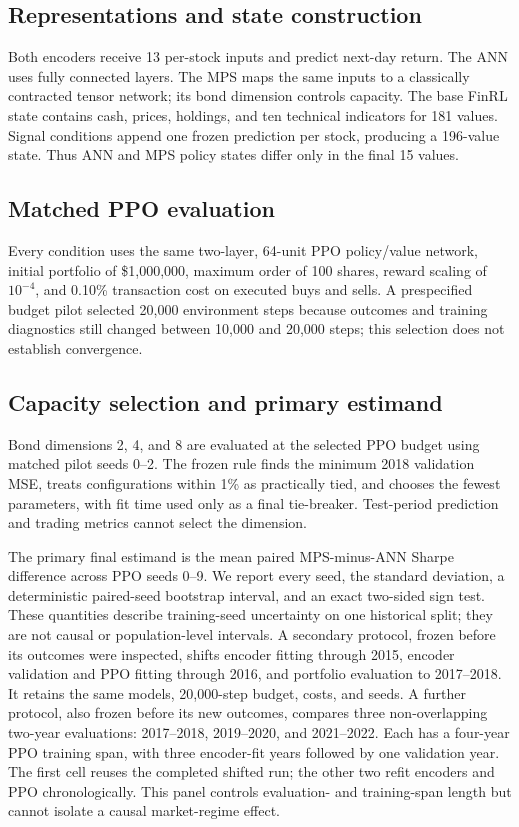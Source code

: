 \documentclass[conference]{IEEEtran}
\begin{document}
\subsection{Representations and state construction}

Both encoders receive 13 per-stock inputs and predict next-day return. The ANN
uses fully connected layers. The MPS maps the same inputs to a classically
contracted tensor network; its bond dimension controls capacity. The base
FinRL state contains cash, prices, holdings, and ten technical indicators for
181 values. Signal conditions append one frozen prediction per stock, producing
a 196-value state. Thus ANN and MPS policy states differ only in the final 15
values.

\subsection{Matched PPO evaluation}

Every condition uses the same two-layer, 64-unit PPO policy/value network,
initial portfolio of \$1,000,000, maximum order of 100 shares, reward scaling
of \(10^{-4}\), and 0.10\% transaction cost on executed buys and sells. A
prespecified budget pilot selected 20,000 environment steps because outcomes
and training diagnostics still changed between 10,000 and 20,000 steps; this
selection does not establish convergence.

\subsection{Capacity selection and primary estimand}

Bond dimensions 2, 4, and 8 are evaluated at the selected PPO budget using
matched pilot seeds 0--2. The frozen rule finds the minimum 2018 validation
MSE, treats configurations within 1\% as practically tied, and chooses the
fewest parameters, with fit time used only as a final tie-breaker. Test-period
prediction and trading metrics cannot select the dimension.

The primary final estimand is the mean paired MPS-minus-ANN Sharpe difference
across PPO seeds 0--9. We report every seed, the standard deviation, a
deterministic paired-seed bootstrap interval, and an exact two-sided sign test.
These quantities describe training-seed uncertainty on one historical split;
they are not causal or population-level intervals. A secondary protocol,
frozen before its outcomes were inspected, shifts encoder fitting through
2015, encoder validation and PPO fitting through 2016, and portfolio evaluation
to 2017--2018. It retains the same models, 20,000-step budget, costs, and seeds.
A further protocol, also frozen before its new outcomes, compares three
non-overlapping two-year evaluations: 2017--2018, 2019--2020, and 2021--2022.
Each has a four-year PPO training span, with three encoder-fit years followed
by one validation year. The first cell reuses the completed shifted run; the
other two refit encoders and PPO chronologically. This panel controls
evaluation- and training-span length but cannot isolate a causal market-regime
effect.
\end{document}
